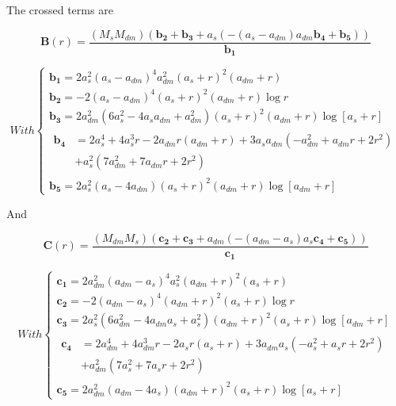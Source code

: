 The crossed terms are

\begin{equation}
\textbf{B}(r)=\frac{\left(M_{s}M_{dm}\right)\left(\mathbf{b_{2}}+\mathbf{b_{3}}+a_{s}\left(-\left(a_{s}-a_{dm}\right)a_{dm}\mathbf{b_{4}}+\mathbf{b_{5}}\right)\right)}{\mathbf{b_{1}}}
\end{equation}

\begin{equation}
With \left\lbrace
\begin{array}{lllll}
\mathbf{b_{1}}=2a_{s}^{2}(a_{s}-a_{dm})^{4}a_{dm}^{2}(a_{s}+r)^{2}(a_{dm}+r)\\
\mathbf{b_{2}}=-2\left(a_{s}-a_{dm}\right)^{4}\left(a_{s}+r\right)^{2}\left(a_{dm}+r\right)\log{r}\\
\mathbf{b_{3}}=2a_{dm}^{2}\left(6a_{s}^{2}-4a_{s}a_{dm}+a_{dm}^{2}\right)
\left(a_{s}+r\right)^{2}\left(a_{dm}+r\right)\log{[a_{s}+r]}\\
\begin{aligned}	
\mathbf{b_{4}} &= 2a_{s}^{4}+4a_{s}^{3}r-2a_{dm}r(a_{dm}+r)+3a_{s}a_{dm}\left(-a_{dm}^{2}+a_{dm}r+2r^{2}\right)\\      &+a_{s}^{2}\left(7a_{dm}^{2}+7a_{dm}r+2r^{2}\right)
\end{aligned}\\
\mathbf{b_{5}}=2a_{s}^{2}\left(a_{s}-4a_{dm}\right)\left(a_{s}+r\right)^{2}\left(a_{dm}+r\right)\log{[a_{dm}+r]}
\end{array}
\right.
\end{equation} 

And

\begin{equation}
\textbf{C}(r)=\frac{\left(M_{dm}M_{s}\right)\left(\mathbf{c_{2}}+\mathbf{c_{3}}+a_{dm}\left(-\left(a_{dm}-a_{s}\right)a_{s}\mathbf{c_{4}}+\mathbf{c_{5}}\right)\right)}{\mathbf{c_{1}}}
\end{equation}

\begin{equation}
With \left\lbrace
\begin{array}{lllll}
\mathbf{c_{1}}=2a_{dm}^{2}(a_{dm}-a_{s})^{4}a_{s}^{2}(a_{dm}+r)^{2}(a_{s}+r)\\
\mathbf{c_{2}}=-2\left(a_{dm}-a_{s}\right)^{4}\left(a_{dm}+r\right)^{2}\left(a_{s}+r\right)\log{r}\\
\mathbf{c_{3}}=2a_{s}^{2}\left(6a_{dm}^{2}-4a_{dm}a_{s}+a_{s}^{2}\right)\left(a_{dm}+r\right)^{2}
\left(a_{s}+r\right)\log{[a_{dm}+r]}\\
\begin{aligned}	
\mathbf{c_{4}} &= 2a_{dm}^{4}+4a_{dm}^{3}r-2a_{s}r(a_{s}+r)+3a_{dm}a_{s}\left(-a_{s}^{2}+a_{s}r+2r^{2}\right)\\      &+a_{dm}^{2}\left(7a_{s}^{2}+7a_{s}r+2r^{2}\right)
\end{aligned}\\
\mathbf{c_{5}} =2a_{dm}^{2}\left(a_{dm}-4a_{s}\right)\left(a_{dm}+r\right)^{2}\left(a_{s}+r\right)\log{[a_{s}+r]}
\end{array}
\right.
\end{equation} 

